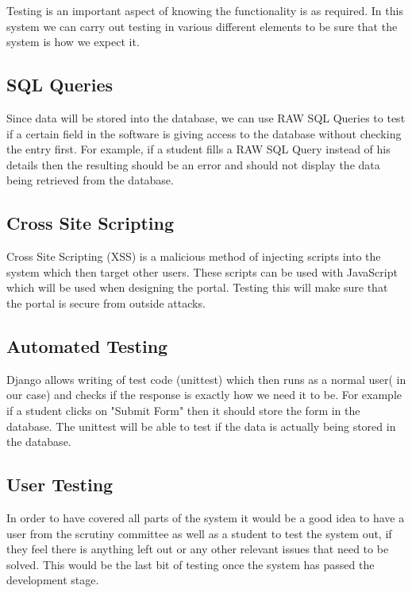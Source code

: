 \documentclass[../main.tex]{subfiles}
\begin{document}
\raggedright

Testing is an important aspect of knowing the functionality is as required. In this system we can carry out testing in various different elements to be sure that the system is how we expect it. 

\subsection{SQL Queries}
Since data will be stored into the database, we can use RAW SQL Queries to test if a certain field in the software is giving access to the database without checking the entry first. For example, if a student fills a RAW SQL Query instead of his details then the resulting should be an error and should not display the data being retrieved from the database. 

\subsection{Cross Site Scripting}
Cross Site Scripting (XSS) is a malicious method of injecting scripts into the system which then target other users. These scripts can be used with JavaScript which will be used when designing the portal. Testing this will make sure that the portal is secure from outside attacks. 

\subsection{Automated Testing}
Django allows writing of test code (unittest)\cite{djangoTesting} which then runs as a normal user( in our case) and checks if the response is exactly how we need it to be. For example if a student clicks on "Submit Form" then it should store the form in the database. The unittest will be able to test if the data is actually being stored in the database. 

\subsection{User Testing}
In order to have covered all parts of the system it would be a good idea to have a user from the scrutiny committee as well as a student to test the system out, if they feel there is anything left out or any other relevant issues that need to be solved. This would be the last bit of testing once the system has passed the development stage.
\end{document}

